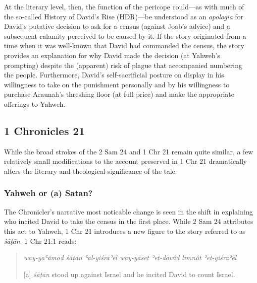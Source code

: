 At the literary level, then, the function of the pericope could---as
with much of the so-called History of David's Rise (HDR)---be understood
as an \emph{apologia} for David's putative decision to ask for a census
(against Joab's advice) and a subsequent calamity perceived to be caused
by it. If the story originated from a time when it was well-known that
David had commanded the census, the story provides an explanation for
why David made the decision (at Yahweh's prompting) despite the
(apparent) risk of plague that accompanied numbering the
people.\autocite[518]{mccarter1984} Furthermore, David's
self-sacrificial posture on display in his willingness to take on the
punishment personally and by his willingness to purchase Araunah's
threshing floor (at full price) and make the appropriate offerings to
Yahweh.

\subsection{1 Chronicles 21}\label{chronicles-21}

While the broad strokes of the 2 Sam 24 and 1 Chr 21 remain quite
similar, a few relatively small modifications to the account preserved
in 1 Chr 21 dramatically alters the literary and theological
significance of the tale.

\subsubsection{Yahweh or (a) Satan?}\label{yahweh-or-a-satan}

The Chronicler's narrative most noticable change is seen in the shift in
explaining who incited David to take the census in the first place.
While 2 Sam 24 attributes this act to Yahweh, 1 Chr 21 introduces a new
figure to the story referred to as \emph{śāṭān}. 1 Chr 21:1 reads:

\begin{quote}
\emph{way-yaʿămōḏ śāṭān ʿal-yiśrāʾēl way-yāseṯ ʾeṯ-dāwı̂ḏ limnôṯ
ʾeṯ-yiśrāʾēl}

{[}a{]} \emph{śāṭān} stood up against Israel and he incited David to
count Israel.
\end{quote}

